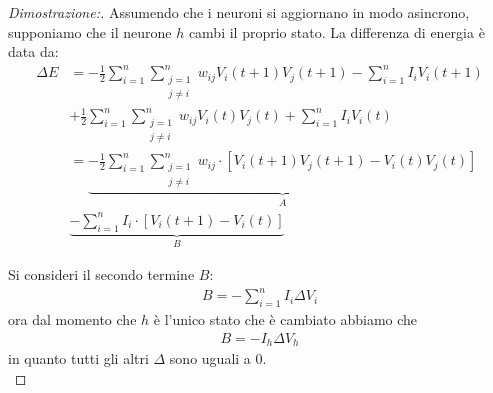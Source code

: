 \begin{proof}[Dimostrazione:]
	Assumendo che i neuroni si aggiornano in modo asincrono, supponiamo che il neurone $h$ cambi il proprio stato. La differenza di energia è data da:
	\begin{align*}
		\Delta E &= - \frac{1}{2} \sum_{i=1}^n \sum_{\substack{j=1 \\ j \neq i}}^n w_{ij} V_i(t + 1) V_j(t + 1) - \sum_{i=1}^n I_i V_i(t + 1) \\
		&+ \frac{1}{2} \sum_{i=1}^n \sum_{\substack{j=1 \\ j \neq i}}^n w_{ij} V_i(t) V_j(t) + \sum_{i=1}^n I_i V_i(t) \\
		&= \underbrace{- \frac{1}{2} \sum_{i=1}^n \sum_{\substack{j=1 \\ j \neq i}}^n w_{ij} \cdot [V_i(t + 1) V_j(t + 1) - V_i(t) V_j(t)]}_\textbf{$A$} \\
		& \underbrace{- \sum_{i=1}^n I_i \cdot [V_i(t + 1) - V_i(t)]}_\textbf{$B$}
	\end{align*}
    
	\newpage
    
	Si consideri il secondo termine $B$:
	\begin{align*}
		B = - \sum_{i=1}^n I_i \Delta V_i
	\end{align*}
	ora dal momento che $h$ è l'unico stato che è cambiato abbiamo che
	\begin{align*}
		B = - I_h \Delta V_h
	\end{align*}
	in quanto tutti gli altri $\Delta$ sono uguali a 0.\\
    

\end{proof}
